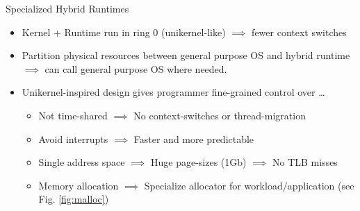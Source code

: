 \begin{block}{Specialized Hybrid Runtimes~\cite{HALE:2015:NAUTILUS}}
  \begin{itemize}
  \item Kernel + Runtime run in ring 0 (unikernel-like) $\implies$ fewer context switches
  \item Partition physical resources between general purpose OS and hybrid runtime~\cite{KOCOLOSKI:2015:PISCES} $\implies$ can call general purpose OS where needed.

  \item {Unikernel-inspired design gives programmer fine-grained control over \ldots}
    \begin{itemize}
    \item Not time-shared $\implies$ No context-switches or thread-migration
    \item Avoid interrupts $\implies$ Faster and more predictable
    \item Single address space $\implies$ Huge page-sizes (1Gb) $\implies$ No TLB misses
    \item Memory allocation $\implies$ Specialize allocator for workload/application (see Fig. \ref{fig:malloc})
    \end{itemize}
  \end{itemize}
\end{block}

